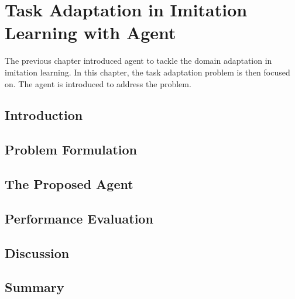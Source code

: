 \chapter{Task Adaptation in Imitation Learning with \TAIL{} Agent\label{ch:TAIL}}


The previous chapter introduced \DAIL{} agent to tackle the domain adaptation in imitation learning.
In this chapter, the task adaptation problem is then focused on.
The \TAIL{} agent is introduced to address the problem.

\renewcommand{\SectionsDir}{Chapter4/Sections}
\renewcommand{\FigsDir}{Chapter4/Figs}
\renewcommand{\TablesDir}{Chapter4/Tables}


\section{Introduction\label{ch:TAIL:sec:Introduction}}


\section{Problem Formulation\label{ch:TAIL:sec:ProblemFormulation}}


\section{The Proposed \TAIL{} Agent\label{ch:TAIL:sec:Proposal}}


\section{Performance Evaluation\label{ch:TAIL:sec:Evaluation}}


\section{Discussion\label{ch:TAIL:sec:Discussion}}


\section{Summary}

